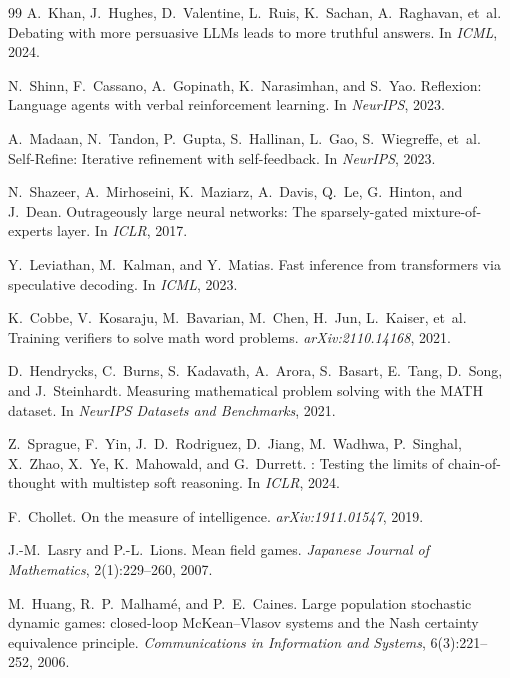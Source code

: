 \documentclass[11pt]{amsart}
\newcommand\1{{\mathds{1}}}
\theoremstyle{definition}
\theoremstyle{remark}
\numberwithin{equation}{section}
\begin{document}
\begin{thebibliography}{99}
A.~Khan, J.~Hughes, D.~Valentine, L.~Ruis, K.~Sachan, A.~Raghavan, et~al.
\newblock Debating with more persuasive {LLMs} leads to more truthful answers.
\newblock In \emph{ICML}, 2024.

N.~Shinn, F.~Cassano, A.~Gopinath, K.~Narasimhan, and S.~Yao.
\newblock Reflexion: Language agents with verbal reinforcement learning.
\newblock In \emph{NeurIPS}, 2023.

A.~Madaan, N.~Tandon, P.~Gupta, S.~Hallinan, L.~Gao, S.~Wiegreffe, et~al.
\newblock Self-{R}efine: Iterative refinement with self-feedback.
\newblock In \emph{NeurIPS}, 2023.

N.~Shazeer, A.~Mirhoseini, K.~Maziarz, A.~Davis, Q.~Le, G.~Hinton, and J.~Dean.
\newblock Outrageously large neural networks: The sparsely-gated mixture-of-experts layer.
\newblock In \emph{ICLR}, 2017.

Y.~Leviathan, M.~Kalman, and Y.~Matias.
\newblock Fast inference from transformers via speculative decoding.
\newblock In \emph{ICML}, 2023.

K.~Cobbe, V.~Kosaraju, M.~Bavarian, M.~Chen, H.~Jun, L.~Kaiser, et~al.
\newblock Training verifiers to solve math word problems.
\newblock \emph{arXiv:2110.14168}, 2021.

D.~Hendrycks, C.~Burns, S.~Kadavath, A.~Arora, S.~Basart, E.~Tang, D.~Song, and J.~Steinhardt.
\newblock Measuring mathematical problem solving with the {MATH} dataset.
\newblock In \emph{NeurIPS Datasets and Benchmarks}, 2021.

Z.~Sprague, F.~Yin, J.~D.~Rodriguez, D.~Jiang, M.~Wadhwa, P.~Singhal, X.~Zhao, X.~Ye, K.~Mahowald, and G.~Durrett.
: Testing the limits of chain-of-thought with multistep soft reasoning.
\newblock In \emph{ICLR}, 2024.

F.~Chollet.
\newblock On the measure of intelligence.
\newblock \emph{arXiv:1911.01547}, 2019.

J.-M.~Lasry and P.-L.~Lions.
\newblock Mean field games.
\newblock \emph{Japanese Journal of Mathematics}, 2(1):229--260, 2007.

M.~Huang, R.~P.~Malham\'e, and P.~E.~Caines.
\newblock Large population stochastic dynamic games: closed-loop {McKean--Vlasov} systems and the {Nash} certainty equivalence principle.
\newblock \emph{Communications in Information and Systems}, 6(3):221--252, 2006.


\end{thebibliography}
\end{document}
